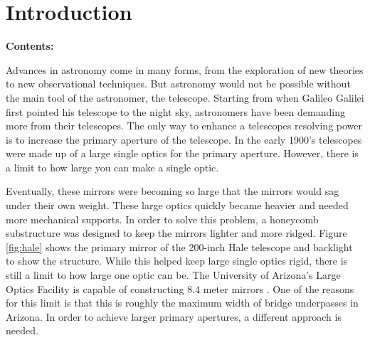 
\chapter{Introduction} %

\noindent\textbf{\large Contents:}

\noindent\hrulefill
\noindent\startcontents[chapters]
\noindent{}
\noindent\hrulefill

\label{Chapter1} %

Advances in astronomy come in many forms, from the exploration of new theories to new observational techniques.
But astronomy would not be possible without the main tool of the astronomer, the telescope.  Starting from when
Galileo Galilei first pointed his telescope to the night sky, astronomers have been demanding more from their
telescopes.  The only way to enhance a telescopes resolving power is to increase the primary aperture of the
telescope.  In the early 1900's telescopes were made up of a large single optics for the primary aperture. 
However, there is a limit to how large you can make a single optic.  

Eventually, these mirrors were becoming so
large that the mirrors would sag under their own weight.  These large optics quickly became heavier and needed
more mechanical supports.  In order to solve this problem, a honeycomb substructure was designed to keep the
mirrors lighter and more ridged.  Figure \ref{fig:hale} shows the primary mirror of the 200-inch Hale telescope
and backlight to show the structure.  While this helped keep large single optics rigid, there is still a limit
to how large one optic can be.  The University of Arizona's Large Optics Facility is capable of constructing
8.4 meter mirrors \cite{LOFTSystems.}.  One of the reasons for this limit is that this is roughly the maximum
width of bridge underpasses in Arizona.  In order to achieve larger primary apertures, a different approach is
needed.


